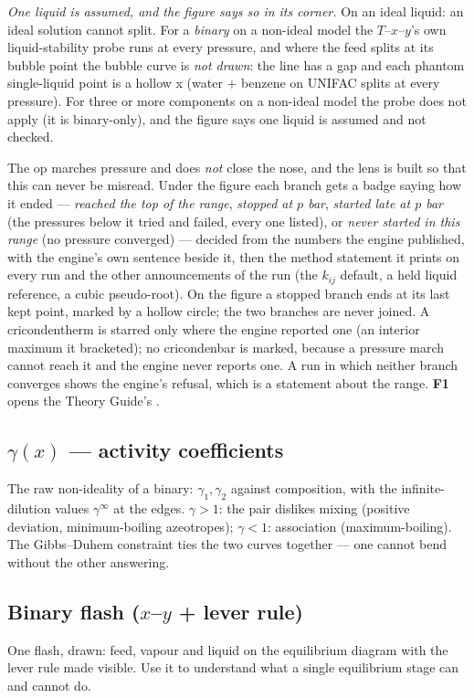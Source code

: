 \documentclass[11pt,a4paper]{article}
\begin{document}
\emph{One liquid is assumed, and the figure says so in its corner.}  On an
ideal liquid: an ideal solution cannot split.  For a \emph{binary} on a
non-ideal model the $T$--$x$--$y$'s own liquid-stability probe runs at every
pressure, and where the feed splits at its bubble point the bubble curve is
\emph{not drawn}: the line has a gap and each phantom single-liquid point is
a hollow x (water + benzene on UNIFAC splits at every pressure).  For three or
more components on a non-ideal model the probe does not apply (it is
binary-only), and the figure says one liquid is assumed and not checked.

The op marches pressure and does \emph{not} close the nose, and the lens is
built so that this can never be misread.  Under the figure each branch gets
a badge saying how it ended --- \emph{reached the top of the range},
\emph{stopped at $p$ bar}, \emph{started late at $p$ bar} (the pressures
below it tried and failed, every one listed), or \emph{never started in this
range} (no pressure converged) --- decided
from the numbers the engine published, with the engine's own sentence beside
it, then the method statement it prints on every run and the other
announcements of the run (the $k_{ij}$ default, a held liquid reference, a
cubic pseudo-root).  On the figure a stopped branch ends at its last kept
point, marked by a hollow circle; the two branches are never joined.  A
cricondentherm is starred only where the engine reported one (an interior
maximum it bracketed); no cricondenbar is marked, because a pressure march
cannot reach it and the engine never reports one.  A run in which neither
branch converges shows the engine's refusal, which is a statement about the
range.  \textbf{F1} opens the Theory Guide's .

\subsection{$\gamma(x)$ --- activity coefficients}
The raw non-ideality of a binary: $\gamma_1, \gamma_2$ against composition,
with the infinite-dilution values $\gamma^\infty$ at the edges.
$\gamma > 1$: the pair dislikes mixing (positive deviation, minimum-boiling
azeotropes); $\gamma < 1$: association (maximum-boiling).  The
Gibbs--Duhem constraint ties the two curves together --- one cannot bend
without the other answering.

\subsection{Binary flash ($x$--$y$ + lever rule)}
One flash, drawn: feed, vapour and liquid on the equilibrium diagram with
the lever rule made visible.  Use it to understand what a single
equilibrium stage can and cannot do.
\end{document}
